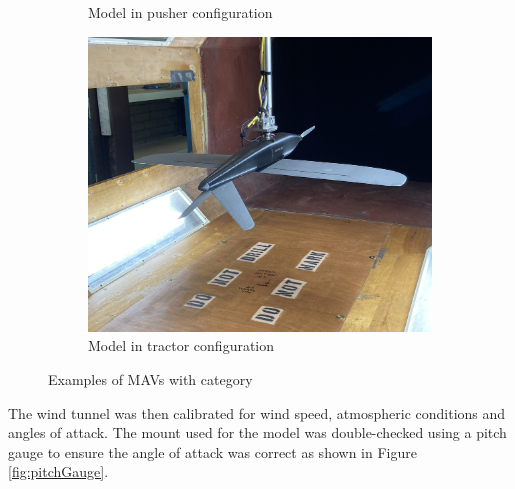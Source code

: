 \begin{figure}[H]
\begin{subfigure}[b]{0.3\textwidth}
             \caption{Model in pusher configuration}
             \label{fig:pusher}
     \end{subfigure}
     \hfill
     \begin{subfigure}[b]{0.3\textwidth}
             \centering
             \includegraphics[scale=0.05]{04_Methodology/Figs/tractors}
             \caption{Model in tractor configuration}
             \label{fig:tractors}
     \end{subfigure}
        \caption{Examples of MAVs with category}
        \label{fig:typesUsed}
\end{figure}


The wind tunnel was then calibrated for wind speed, atmospheric conditions and angles of attack. The mount used for the model was double-checked using a pitch gauge to ensure the angle of attack was correct as shown in Figure \ref{fig:pitchGauge}. 


